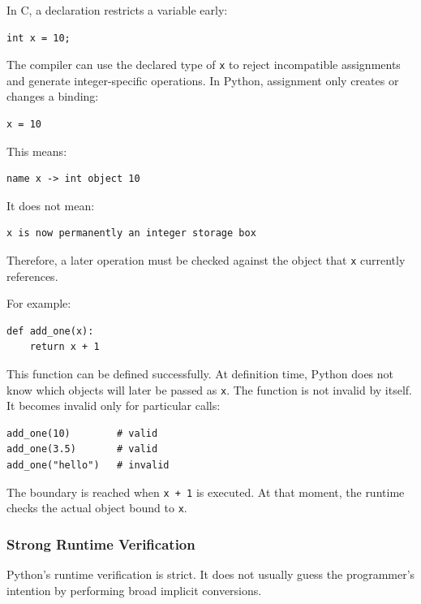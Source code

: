 In C, a declaration restricts a variable early:

\begin{verbatim}
int x = 10;
\end{verbatim}

The compiler can use the declared type of \texttt{x} to reject incompatible assignments and generate integer-specific operations. In Python, assignment only creates or changes a binding:

\begin{verbatim}
x = 10
\end{verbatim}

This means:

\begin{verbatim}
name x -> int object 10
\end{verbatim}

It does not mean:

\begin{verbatim}
x is now permanently an integer storage box
\end{verbatim}

Therefore, a later operation must be checked against the object that \texttt{x} currently references.

For example:

\begin{verbatim}
def add_one(x):
    return x + 1
\end{verbatim}

This function can be defined successfully. At definition time, Python does not know which objects will later be passed as \texttt{x}. The function is not invalid by itself. It becomes invalid only for particular calls:

\begin{verbatim}
add_one(10)        # valid
add_one(3.5)       # valid
add_one("hello")   # invalid
\end{verbatim}

The boundary is reached when \texttt{x + 1} is executed. At that moment, the runtime checks the actual object bound to \texttt{x}.

\subsubsection*{Strong Runtime Verification}

Python's runtime verification is strict. It does not usually guess the programmer's intention by performing broad implicit conversions.

